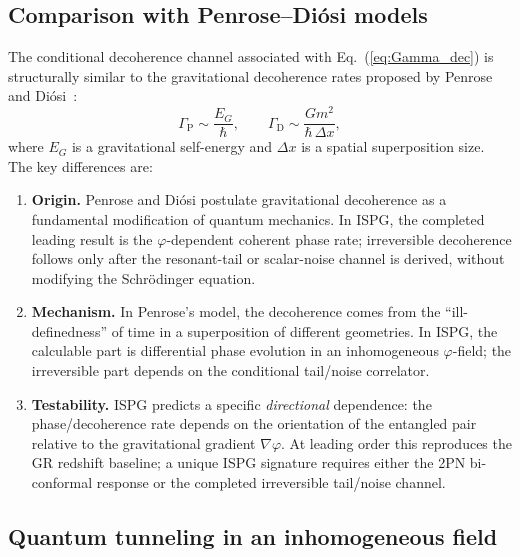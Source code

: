\documentclass[aps,prd,onecolumn,superscriptaddress,nofootinbib,showpacs,12pt,notitlepage]{revtex4-2}
\begin{document}
\subsection{Comparison with Penrose--Di\'osi models}
\label{sec:penrose_comparison}

The conditional decoherence channel associated with
Eq.~(\ref{eq:Gamma_dec}) is structurally similar to the
gravitational decoherence rates proposed by
Penrose~\cite{Penrose1996} and
Di\'osi~\cite{Diosi1987}:
\begin{equation}
  \Gamma_{\mathrm{P}} \sim \frac{E_G}{\hbar},
  \qquad
  \Gamma_{\mathrm{D}} \sim
    \frac{G m^{2}}{\hbar\,\Delta x},
\end{equation}
where $E_G$ is a gravitational self-energy and $\Delta x$
is a spatial superposition size.  The key differences are:

\begin{enumerate}
  \item \textbf{Origin.}  Penrose and Di\'osi postulate
    gravitational decoherence as a fundamental modification
    of quantum mechanics.  In ISPG, the completed leading
    result is the $\varphi$-dependent coherent phase rate;
    irreversible decoherence follows only after the resonant-tail
    or scalar-noise channel is derived, without modifying the
    Schr\"odinger equation.
  \item \textbf{Mechanism.}  In Penrose's model, the
    decoherence comes from the ``ill-definedness'' of time
    in a superposition of different geometries.  In ISPG,
    the calculable part is differential phase evolution in
    an inhomogeneous $\varphi$-field; the irreversible part
    depends on the conditional tail/noise correlator.
  \item \textbf{Testability.}  ISPG predicts a specific
    \emph{directional} dependence: the phase/decoherence rate
    depends on the orientation of the entangled pair
    relative to the gravitational gradient $\nabla\varphi$.
    At leading order this reproduces the GR redshift baseline;
    a unique ISPG signature requires either the 2PN
    bi-conformal response or the completed irreversible
    tail/noise channel.
\end{enumerate}

\subsection{Quantum tunneling in an inhomogeneous field}
\label{sec:tunneling}
\end{document}
